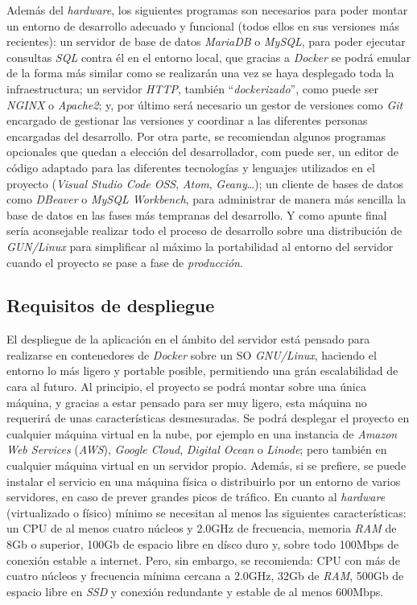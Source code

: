 \documentclass[12pt,a4paper,titlepage]{article}
\begin{document}
    Además del \textit{hardware}, los siguientes programas son necesarios para poder montar un entorno de desarrollo adecuado y funcional (todos ellos en sus versiones más recientes): un servidor de base de datos \emph{MariaDB} o \emph{MySQL}, para poder ejecutar consultas \emph{SQL} contra él en el entorno local, que gracias a \textit{Docker} \cite{docker:overview} se podrá emular de la forma más similar como se realizarán una vez se haya desplegado toda la infraestructura; un servidor \textit{HTTP}, también ``\textit{dockerizado}'', como puede ser \emph{NGINX} o \emph{Apache2}; y, por último será necesario un gestor de versiones como \textit{Git} encargado de gestionar las versiones y coordinar a las diferentes personas encargadas del desarrollo. Por otra parte, se recomiendan algunos programas opcionales que quedan a elección del desarrollador, com puede ser, un editor de código adaptado para las diferentes tecnologías y lenguajes utilizados en el proyecto (\emph{Visual Studio Code OSS}, \emph{Atom}, \emph{Geany}\dots); un cliente de bases de datos como \emph{DBeaver} o \emph{MySQL Workbench}, para administrar de manera más sencilla la base de datos en las fases más tempranas del desarrollo. Y como apunte final sería aconsejable realizar todo el proceso de desarrollo sobre una distribución de \emph{GUN/Linux} para simplificar al máximo la portabilidad al entorno del servidor cuando el proyecto se pase a fase de \emph{producción}.

    \subsection{Requisitos de despliegue}

    El despliegue de la aplicación en el ámbito del servidor está pensado para realizarse en contenedores de \textit{Docker} sobre un SO \emph{GNU/Linux}, haciendo el entorno lo más ligero y portable posible, permitiendo una grán escalabilidad de cara al futuro. Al principio, el proyecto se podrá montar sobre una única máquina, y gracias a estar pensado para ser muy ligero, esta máquina no requerirá de unas características desmesuradas. Se podrá desplegar el proyecto en cualquier máquina virtual en la nube, por ejemplo en una instancia de \textit{Amazon Web Services} (\textit{AWS}), \textit{Google Cloud}, \textit{Digital Ocean} o \textit{Linode}; pero también en cualquier máquina virtual en un servidor propio. Además, si se prefiere, se puede instalar el servicio en una máquina física o distribuirlo por un entorno de varios servidores, en caso de prever grandes picos de tráfico. En cuanto al \textit{hardware} (virtualizado o físico) mínimo se necesitan al menos las siguientes características: un CPU de al menos cuatro núcleos y 2.0GHz de frecuencia, memoria \textit{RAM} de 8Gb o superior, 100Gb de espacio libre en dísco duro y, sobre todo 100Mbps de conexión estable a internet. Pero, sin embargo, se recomienda: CPU con más de cuatro núcleos y frecuencia mínima cercana a 2.0GHz, 32Gb de \textit{RAM}, 500Gb de espacio libre en \textit{SSD} y conexión redundante y estable de al menos 600Mbps.
\end{document}

